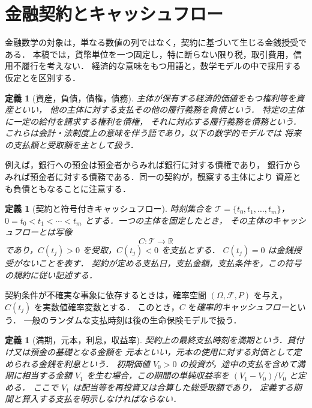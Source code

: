 \documentclass[a5paper,10pt,onecolumn]{jsarticle}
\theoremstyle{mathnotetheorem}
\newtheorem{definition}[theorem]{定義}
\newcommand{\R}{\mathbb{R}}
\begin{document}
\section{金融契約とキャッシュフロー}

金融数学の対象は，単なる数値の列ではなく，契約に基づいて生じる金銭授受である．
本稿では，貨幣単位を一つ固定し，特に断らない限り税，取引費用，信用不履行を考えない．
経済的な意味をもつ用語と，数学モデルの中で採用する仮定とを区別する．

\begin{definition}[資産，負債，債権，債務]
主体が保有する経済的価値をもつ権利等を\emph{資産}といい，
他の主体に対する支払その他の履行義務を\emph{負債}という．
特定の主体に一定の給付を請求する権利を\emph{債権}，
それに対応する履行義務を\emph{債務}という．
これらは会計・法制度上の意味を伴う語であり，以下の数学的モデルでは
将来の支払額と受取額を主として扱う．
\end{definition}

例えば，銀行への預金は預金者からみれば銀行に対する債権であり，
銀行からみれば預金者に対する債務である．同一の契約が，観察する主体により
資産とも負債ともなることに注意する．

\begin{definition}[契約と符号付きキャッシュフロー]
時刻集合を $\mathcal T=\{t_0,t_1,\ldots,t_m\}$，
$0=t_0<t_1<\cdots<t_m$ とする．一つの主体を固定したとき，
その主体の\emph{キャッシュフロー}とは写像
\[
 C:\mathcal T\longrightarrow\R
\]
であり，$C(t_j)>0$ を受取，$C(t_j)<0$ を支払とする．
$C(t_j)=0$ は金銭授受がないことを表す．
契約が定める支払日，支払金額，支払条件を，この符号の規約に従い記述する．
\end{definition}

契約条件が不確実な事象に依存するときは，確率空間
$(\Omega,\mathcal F,P)$ を与え，$C(t_j)$ を実数値確率変数とする．
このとき，$C$ を\emph{確率的キャッシュフロー}という．
一般のランダムな支払時刻は後の生命保険モデルで扱う．

\begin{definition}[満期，元本，利息，収益率]
契約上の最終支払時刻を\emph{満期}という．貸付け又は預金の基礎となる金額を
\emph{元本}といい，元本の使用に対する対価として定められる金銭を\emph{利息}という．
初期価値 $V_0>0$ の投資が，途中の支払を含めて満期に相当する金額
$V_1$ を生む場合，この期間の\emph{単純収益率}を $(V_1-V_0)/V_0$ と定める．
ここで $V_1$ は配当等を再投資又は合算した総受取額であり，
定義する期間と算入する支払を明示しなければならない．
\end{definition}
\end{document}
